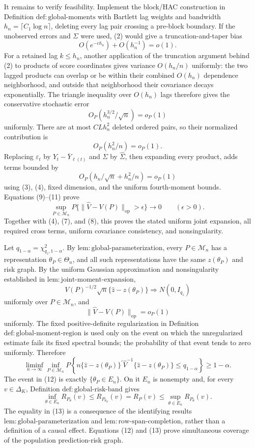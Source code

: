 It remains to verify feasibility.  Implement the block/HAC construction in Definition \(\mathrm{def:global\mbox{-}moments}\) with Bartlett lag weights and bandwidth \(h_n=\lceil C_1\log n\rceil\), deleting every lag pair crossing a pre-block boundary.  If the unobserved errors and \(\Sigma\) were used, (2) would give a truncation-and-taper bias
\[
O(e^{-ch_n})+O(h_n^{-1})=o(1).
\]
For a retained lag \(k\leq h_n\), another application of the truncation argument behind (2) to products of score coordinates gives variance \(O(h_n/n)\) uniformly: the two lagged products can overlap or be within their combined \(O(h_n)\) dependence neighborhood, and outside that neighborhood their covariance decays exponentially.  The triangle inequality over \(O(h_n)\) lags therefore gives the conservative stochastic error
\[
O_P(h_n^{3/2}/\sqrt n)=o_P(1)
\tag{9}
\]
uniformly.  There are at most \(C Lh_n^2\) deleted ordered pairs, so their normalized contribution is
\[
O_P(h_n^2/n)=o_P(1).
\tag{10}
\]
Replacing \(\varepsilon_t\) by \(Y_t-\overline Y_{\ell(t)}\) and \(\Sigma\) by \(\widehat\Sigma\), then expanding every product, adds terms bounded by
\[
O_P(h_n/\sqrt n+h_n^2/n)=o_P(1)
\tag{11}
\]
using (3), (4), fixed dimension, and the uniform fourth-moment bounds.  Equations (9)--(11) prove
\[
\sup_{P\in\mathcal M_n}
P\{\|\widehat V-V(P)\|_{\mathrm{op}}>\epsilon\}
\longrightarrow0
\qquad(\epsilon>0).
\]
Together with (4), (7), and (8), this proves the stated uniform joint expansion, all required cross terms, uniform covariance consistency, and nonsingularity.

Let \(q_{1-\alpha}=\chi^2_{q_z,1-\alpha}\).  By \(\mathrm{lem:global\mbox{-}parameterization}\), every \(P\in\mathcal M_n\) has a representation \(\theta_P\in\Theta_n\), and all such representations have the same \(z(\theta_P)\) and risk graph.  By the uniform Gaussian approximation and nonsingularity established in \(\mathrm{lem:joint\mbox{-}moment\mbox{-}expansion}\),
\[
V(P)^{-1/2}\sqrt n\{\widehat z-z(\theta_P)\}
\Longrightarrow N(0,I_{q_z})
\]
uniformly over \(P\in\mathcal M_n\), and
\[
\|\widehat V-V(P)\|_{\mathrm{op}}=o_P(1)
\]
uniformly.  The fixed positive-definite regularization in Definition \(\mathrm{def:global\mbox{-}moment\mbox{-}region}\) is used only on the event on which the unregularized estimate fails its fixed spectral bounds; the probability of that event tends to zero uniformly.  Therefore
\[
\liminf_{n\to\infty}\inf_{P\in\mathcal M_n}
P\!\left\{
n\{\widehat z-z(\theta_P)\}^{\prime}
\widehat V^{-1}
\{\widehat z-z(\theta_P)\}
\leq q_{1-\alpha}
\right\}
\geq1-\alpha.
\tag{12}
\]
The event in (12) is exactly \(\{\theta_P\in E_n\}\).  On it \(E_n\) is nonempty and, for every \(v\in\Delta_K\), Definition \(\mathrm{def:global\mbox{-}risk\mbox{-}band}\) gives
\[
\inf_{\theta\in E_n}R_{P_\theta}(v)
\leq R_{P_{\theta_P}}(v)=R_P(v)
\leq\sup_{\theta\in E_n}R_{P_\theta}(v).
\tag{13}
\]
The equality in (13) is a consequence of the identifying results \(\mathrm{lem:global\mbox{-}parameterization}\) and \(\mathrm{lem:row\mbox{-}span\mbox{-}completion}\), rather than a definition of a causal effect.  Equations (12) and (13) prove simultaneous coverage of the population prediction-risk graph.

